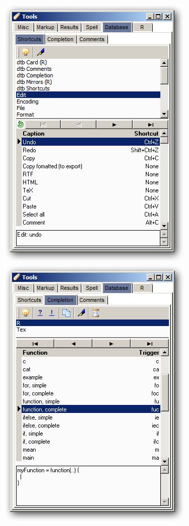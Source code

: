 \includegraphics[scale=0.50]{./res/tools_database_shortcuts.png}~~
\includegraphics[scale=0.50]{./res/tools_database_completion.png}~~
